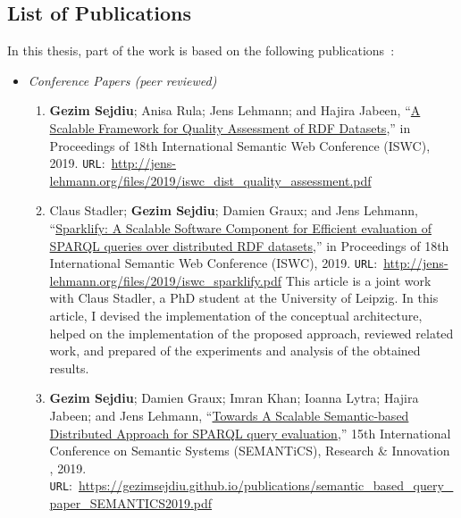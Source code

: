 \subsection{List of Publications}
In this thesis, part of the work is based on the following publications~\cite{sejdiu-2019-sansa-dist-quality-assessment-iswc, 2019-sansa-sparklify-iswc, sejdiu-2019-sansa-semantic-based-semantics, sejdiu-2018-dist-lod-stats-iswc, lehmann-2017-sansa-iswc, Auer+ICWE-2017, sansa-sparklify-ISWC-demo, sansa-hubs-and-authorities-transaction-semantics19-poster, piping-clustering-eswc19-poster, sejdiu-2018-statisfy-iswc-poster, graux-2018-sansa-ethereum-semantics-poster, iermilov-2017-sansa-iswc-demo, KESW_2017_BDE}:
\begin{itemize}
\item \emph{Conference Papers (peer reviewed)}
\begin{enumerate}
    
    \item \textbf{Gezim Sejdiu}; Anisa Rula; Jens Lehmann; and Hajira Jabeen, “\href{http://jens-lehmann.org/files/2019/iswc_dist_quality_assessment.pdf}{A Scalable Framework for Quality Assessment of RDF Datasets},” in Proceedings of 18th International Semantic Web Conference (ISWC), 2019. \texttt{URL}:~\url{http://jens-lehmann.org/files/2019/iswc_dist_quality_assessment.pdf}

    \item Claus Stadler; \textbf{Gezim Sejdiu}; Damien Graux; and Jens Lehmann, “\href{http://jens-lehmann.org/files/2019/iswc_sparklify.pdf}{Sparklify: A Scalable Software Component for Efficient evaluation of SPARQL queries over distributed RDF datasets},” in Proceedings of 18th International Semantic Web Conference (ISWC), 2019. \texttt{URL}:~\url{http://jens-lehmann.org/files/2019/iswc_sparklify.pdf}
    This article is a joint work with Claus Stadler, a PhD student at the University of Leipzig. 
    In this article, I devised the implementation of the conceptual architecture, helped on the implementation of the proposed approach, reviewed related work, and prepared of the experiments and analysis of the obtained results.

    \item \textbf{Gezim Sejdiu}; Damien Graux; Imran Khan; Ioanna Lytra; Hajira Jabeen; and Jens Lehmann, “\href{https://gezimsejdiu.github.io/publications/semantic_based_query_paper_SEMANTICS2019.pdf}{Towards A Scalable Semantic-based Distributed Approach for SPARQL query evaluation},” 15th International Conference on Semantic Systems (SEMANTiCS), Research \& Innovation , 2019. \texttt{URL}:~\url{https://gezimsejdiu.github.io/publications/semantic_based_query_paper_SEMANTICS2019.pdf}


\end{enumerate}
\end{itemize}
